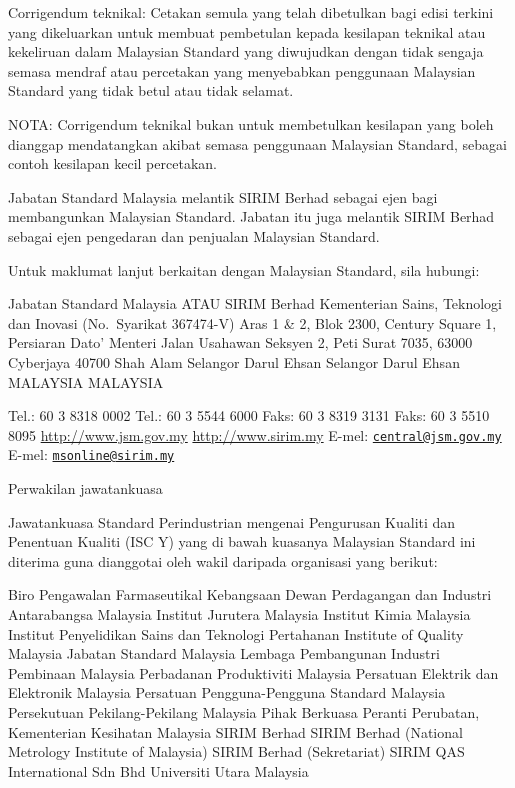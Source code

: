 \documentclass[
]{article}
\begin{document}
Corrigendum teknikal: Cetakan semula yang telah dibetulkan bagi edisi
terkini yang dikeluarkan untuk membuat pembetulan kepada kesilapan
teknikal atau kekeliruan dalam Malaysian Standard yang diwujudkan dengan
tidak sengaja semasa mendraf atau percetakan yang menyebabkan penggunaan
Malaysian Standard yang tidak betul atau tidak selamat.

NOTA: Corrigendum teknikal bukan untuk membetulkan kesilapan yang boleh
dianggap mendatangkan akibat semasa penggunaan Malaysian Standard,
sebagai contoh kesilapan kecil percetakan.

Jabatan Standard Malaysia melantik SIRIM Berhad sebagai ejen bagi
membangunkan Malaysian Standard. Jabatan itu juga melantik SIRIM Berhad
sebagai ejen pengedaran dan penjualan Malaysian Standard.

Untuk maklumat lanjut berkaitan dengan Malaysian Standard, sila hubungi:

Jabatan Standard Malaysia ATAU SIRIM Berhad Kementerian Sains, Teknologi
dan Inovasi (No.~Syarikat 367474-V) Aras 1 \& 2, Blok 2300, Century
Square 1, Persiaran Dato' Menteri Jalan Usahawan Seksyen 2, Peti Surat
7035, 63000 Cyberjaya 40700 Shah Alam Selangor Darul Ehsan Selangor
Darul Ehsan MALAYSIA MALAYSIA

Tel.: 60 3 8318 0002 Tel.: 60 3 5544 6000 Faks: 60 3 8319 3131 Faks: 60
3 5510 8095 \url{http://www.jsm.gov.my} \url{http://www.sirim.my} E-mel:
\href{mailto:central@jsm.gov.my}{\nolinkurl{central@jsm.gov.my}} E-mel:
\href{mailto:msonline@sirim.my}{\nolinkurl{msonline@sirim.my}}

Perwakilan jawatankuasa

Jawatankuasa Standard Perindustrian mengenai Pengurusan Kualiti dan
Penentuan Kualiti (ISC Y) yang di bawah kuasanya Malaysian Standard ini
diterima guna dianggotai oleh wakil daripada organisasi yang berikut:

Biro Pengawalan Farmaseutikal Kebangsaan Dewan Perdagangan dan Industri
Antarabangsa Malaysia Institut Jurutera Malaysia Institut Kimia Malaysia
Institut Penyelidikan Sains dan Teknologi Pertahanan Institute of
Quality Malaysia Jabatan Standard Malaysia Lembaga Pembangunan Industri
Pembinaan Malaysia Perbadanan Produktiviti Malaysia Persatuan Elektrik
dan Elektronik Malaysia Persatuan Pengguna-Pengguna Standard Malaysia
Persekutuan Pekilang-Pekilang Malaysia Pihak Berkuasa Peranti Perubatan,
Kementerian Kesihatan Malaysia SIRIM Berhad SIRIM Berhad (National
Metrology Institute of Malaysia) SIRIM Berhad (Sekretariat) SIRIM QAS
International Sdn Bhd Universiti Utara Malaysia
\end{document}
